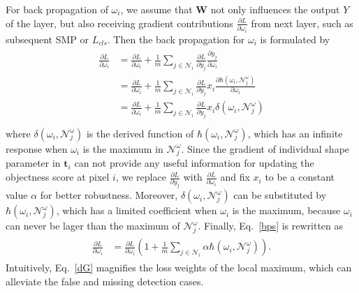 For back propagation of $\omega_i$, we assume that $\mathbf{W}$ not only influences the output $Y$ of the layer, but also receiving gradient contributions $\frac{\partial L}{\partial \omega_{i}}$ from next layer, such as subsequent SMP or $L_{cls}$.
Then the back propagation for $\omega_{i}$ is formulated by
%
\begin{eqnarray}\label{bps}
\begin{aligned}
\frac{\partial L}{\partial \omega_{i}}&=\frac{\partial L}{\partial \omega_{i}}+\frac{1}{m}\sum_{j\in\mathcal{N}_{i}}\frac{\partial L}{\partial y_{j}}\frac{\partial y_{j}}{\partial \omega_{i}}\\
&=\frac{\partial L}{\partial \omega_{i}}+\frac{1}{m}\sum_{j\in\mathcal{N}_{i}}\frac{\partial L}{\partial y_{j}}x_{i}\frac{\partial \hbar(\omega_{i},\mathcal{N}^{\omega}_{j})}{\partial \omega_{i}}\\
&=\frac{\partial L}{\partial \omega_{i}}+\frac{1}{m}\sum_{j\in\mathcal{N}_{i}}\frac{\partial L}{\partial y_{j}}x_{i}\delta(\omega_{i},\mathcal{N}^{\omega}_{j})\\
\end{aligned}
\end{eqnarray}
where $\delta(\omega_{i},\mathcal{N}^{\omega}_{j})$ is the derived function of $\hbar(\omega_{i},\mathcal{N}^{\omega}_{j})$, which has an infinite response when $\omega_{i}$ is the maximum in $\mathcal{N}^{\omega}_{j}$.
Since the gradient of individual shape parameter in $\mathbf{t}_i$ can not provide any useful information for updating the objectness score at pixel $i$, we replace $\frac{\partial L}{\partial y_{j}}$ with $\frac{\partial L}{\partial \omega_{i}}$ and fix $x_i$ to be a constant value $\alpha$ for better robustness.
%
Moreover, $\delta(\omega_{i},\mathcal{N}^{\omega}_{j})$ can be substituted by $\hbar(\omega_{i},\mathcal{N}^{\omega}_{j})$, which has a limited coefficient when $\omega_{i}$ is the maximum, because $\omega_i$ can never be lager than the maximum of $\mathcal{N}^{\omega}_{j}$.
Finally, Eq.~\ref{bps} is rewritten as
\begin{eqnarray}\label{dG}
\begin{aligned}
\frac{\partial L}{\partial \omega_{i}}&=\frac{\partial L}{\partial \omega_{i}}(1+\frac{1}{m}\sum_{j\in\mathcal{N}_{i}}\alpha \hbar(\omega_{i},\mathcal{N}^{\omega}_{j})).
\end{aligned}
\end{eqnarray}
%
Intuitively, Eq.~\ref{dG} magnifies the loss weights of the local maximum, which can alleviate the false and missing detection cases.

